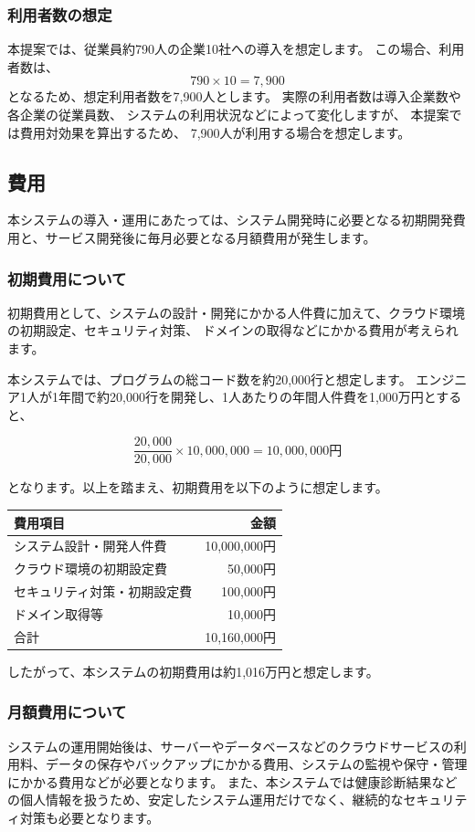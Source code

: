 \documentclass[uplatex,dvipdfmx]{jlreq}
\begin{document}
\subsubsection{利用者数の想定} 
本提案では、従業員約790人の企業10社への導入を想定します。 
この場合、利用者数は、
\[
790 \times 10 = 7,900
\]
となるため、想定利用者数を7,900人とします。
 実際の利用者数は導入企業数や各企業の従業員数、 システムの利用状況などによって変化しますが、 本提案では費用対効果を算出するため、 7,900人が利用する場合を想定します。 

\subsection{費用}
本システムの導入・運用にあたっては、システム開発時に必要となる初期開発費用と、サービス開発後に毎月必要となる月額費用が発生します。

 \subsubsection{初期費用について} 
初期費用として、システムの設計・開発にかかる人件費に加えて、クラウド環境の初期設定、セキュリティ対策、 ドメインの取得などにかかる費用が考えられます。 

本システムでは、プログラムの総コード数を約20,000行と想定します。
 エンジニア1人が1年間で約20,000行を開発し、1人あたりの年間人件費を1,000万円とすると、 

\[ 
\frac{20,000}{20,000} \times 10,000,000 = 10,000,000 \text{円} 
\] 

となります。以上を踏まえ、初期費用を以下のように想定します。

\begin{center} 
\begin{tabular}{lr} \hline 
費用項目 & 金額 \\ \hline 
システム設計・開発人件費 & 10,000,000円 \\ 
クラウド環境の初期設定費  & 50,000円 \\ 
セキュリティ対策・初期設定費  & 100,000円 \\ 
ドメイン取得等  & 10,000円 \\ \hline 
合計 & 10,160,000円 \\ \hline
 \end{tabular} 
\end{center} 

したがって、本システムの初期費用は約1,016万円と想定します。 

\subsubsection{月額費用について}
システムの運用開始後は、サーバーやデータベースなどのクラウドサービスの利用料、データの保存やバックアップにかかる費用、システムの監視や保守・管理にかかる費用などが必要となります。
また、本システムでは健康診断結果などの個人情報を扱うため、安定したシステム運用だけでなく、継続的なセキュリティ対策も必要となります。 
\end{document}
